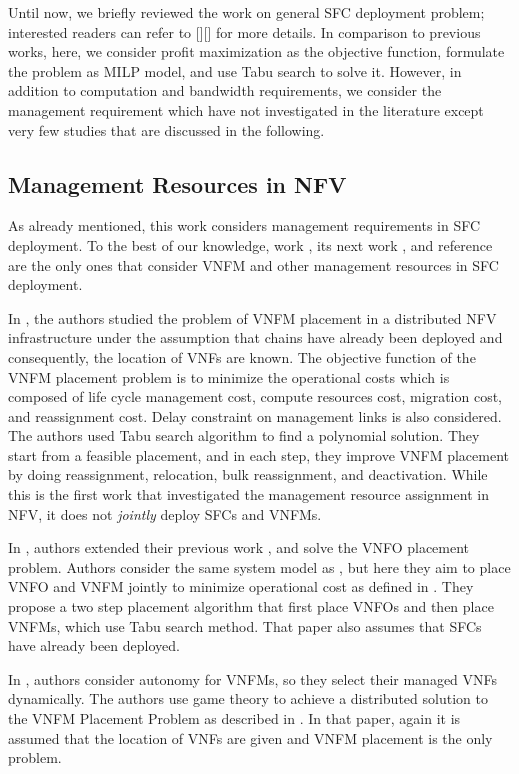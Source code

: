 Until now, we briefly reviewed the work on general SFC deployment problem; interested readers can refer to [][] for more details. In comparison to previous works, here, we consider profit maximization as the objective function, formulate the problem as MILP model, and use Tabu search to solve it. However, in addition to computation and bandwidth requirements, we consider the management requirement which have not investigated in the literature except very few studies that are discussed in the following.


\subsection{Management Resources in NFV}
As already mentioned, this work considers management requirements in SFC deployment.
To the best of our knowledge, work \cite{AbuLebdeh2017}, its next work \cite{AbuLebdeh20172}, and reference \cite{Chiang2019} are the only ones that consider VNFM and other management resources in SFC deployment.

In \cite{AbuLebdeh2017}, the authors studied the problem of VNFM placement in a distributed NFV infrastructure under the assumption that chains have already been deployed and consequently, the location of VNFs are known.
The objective function of the VNFM placement problem is to minimize the operational costs which is composed of life cycle management cost,
compute resources cost, migration cost, and reassignment cost. Delay constraint on management links is also considered.
The authors used Tabu search algorithm
to find a polynomial solution. They start from a feasible placement, and in each step, they improve VNFM placement by doing reassignment, relocation, bulk reassignment, and deactivation.
While this is the first work that investigated the management resource assignment in NFV, it does not \textit{jointly} deploy SFCs and VNFMs.

In \cite{AbuLebdeh20172}, authors extended their previous work \cite{AbuLebdeh2017}, and solve the VNFO placement problem.
Authors consider the same system model as \cite{AbuLebdeh2017}, but here they aim to place VNFO and VNFM jointly to minimize operational cost as defined in \cite{AbuLebdeh2017}.
They propose a two step placement algorithm that first place VNFOs and then place VNFMs, which use Tabu search method. That paper also assumes that SFCs have already been deployed.

In \cite{Chiang2019}, authors consider autonomy for VNFMs, so they select their managed VNFs dynamically. The authors use game theory to achieve a distributed solution to the VNFM Placement Problem as described in \cite{AbuLebdeh2017}.
In that paper, again it is assumed that the location of VNFs are given and VNFM placement is the only problem.

